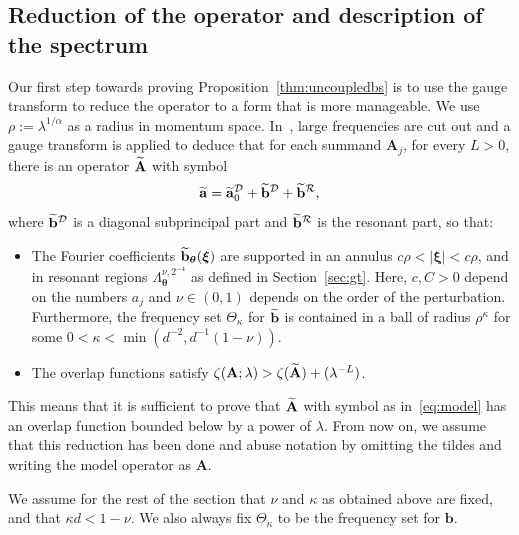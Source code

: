 \documentclass[AHL,Unicode,longabstracts,published]{cedram}
\newcommand{\CD}{\mathcal{D}}
\newcommand{\CR}{\mathcal{R}}
\newcommand{\btheta}{\boldsymbol \theta}
\newcommand{\bxi}{\boldsymbol \xi}
\newcommand{\ba}{\mathbf a}
\newcommand{\BA}{\mathbf A}
\newcommand{\bbb}{\mathbf b}
\newcommand{\abs}[1]{\left\lvert #1 \right\rvert}
\let\oldtilde\tilde
\renewcommand*{\tilde}[1]{\mathchoice{\widetilde{#1}}{\widetilde{#1}}{\oldtilde{#1}}{\oldtilde{#1}}}
\begin{document}
\subsection{Reduction of the operator and description of the spectrum} \label{sec:constr}

Our first step towards proving Proposition~\ref{thm:uncoupledbs} is to use the gauge transform to reduce the operator to a form that is more manageable. We use $\rho := \lambda^{1/\alpha}$ as a radius in momentum space. In~\cite[Theorem~4.3 and Lemma~10.4]{ParSob2010}, large frequencies are cut out and a gauge transform is applied to deduce that for each summand $\BA_j$, for every $L > 0$, there is an operator $\tilde \BA$ with symbol
\begin{equation}\label{eq:model}
\tilde \ba =
\tilde \ba_0^\CD + \tilde\bbb^\CD + \tilde \bbb^\CR,
\end{equation}
where $\tilde \bbb^\CD$ is a diagonal subprincipal part and $\tilde \bbb^\CR$ is the resonant part, so that:
\begin{itemize}
\item The Fourier coefficients $\tilde \bbb_{\btheta}(\bxi)$ are supported in an annulus $c \rho < \abs \bxi < c\rho$, and in resonant regions $\Lambda_{\btheta}^{\nu,2^{-4}}$ as defined in Section~\ref{sec:gt}. Here, $c,C > 0$ depend on the numbers $a_j$ and $\nu \in (0,1)$ depends on the order of the perturbation. Furthermore, the frequency set $\Theta_\kappa$ for $\tilde \bbb$ is contained in a ball of radius $\rho^\kappa$ for some $0 < \kappa <
\min(d^{-2},d^{-1}(1 -\nu))$.
\item The overlap functions satisfy $\zeta(\BA;\lambda) > \zeta(\tilde \BA) + (\lambda^{-L})$.
\end{itemize}
This means that it is sufficient to prove that $\tilde \BA$ with symbol as in~\eqref{eq:model} has an overlap function bounded below by a power of $\lambda$. From now on, we assume that this reduction has been done and abuse notation by omitting the tildes and writing the model operator as $\BA$.

\begin{rema}\label{rmk:kappanufixed}
We assume for the rest of the section that $\nu$ and $\kappa$ as obtained above are fixed, and that $\kappa d < 1 - \nu$. We also always fix $\Theta_\kappa$ to be the frequency set for $\bbb$.
\end{rema}
\end{document}
